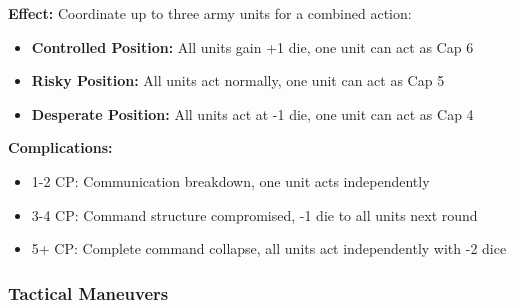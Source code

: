\documentclass[11pt,letterpaper]{article}
\begin{document}
\textbf{Effect:} Coordinate up to three army units for a combined action:
\begin{itemize}[leftmargin=*]
    \item \textbf{Controlled Position:} All units gain +1 die, one unit can act as Cap 6
    \item \textbf{Risky Position:} All units act normally, one unit can act as Cap 5
    \item \textbf{Desperate Position:} All units act at -1 die, one unit can act as Cap 4
\end{itemize}

\textbf{Complications:}
\begin{itemize}[leftmargin=*]
    \item 1-2 CP: Communication breakdown, one unit acts independently
    \item 3-4 CP: Command structure compromised, -1 die to all units next round
    \item 5+ CP: Complete command collapse, all units act independently with -2 dice
\end{itemize}

\subsubsection{Tactical Maneuvers}
\end{document}

